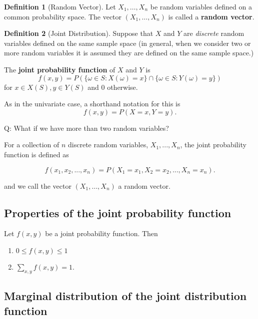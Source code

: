 \documentclass[
]{book}
\providecommand{\tightlist}{%
  \setlength{\itemsep}{0pt}\setlength{\parskip}{0pt}}
\theoremstyle{definition}
\newtheorem{definition}{Definition}[chapter]
\theoremstyle{definition}
\theoremstyle{definition}
\theoremstyle{definition}
\theoremstyle{remark}
\begin{document}
\begin{definition}[Random Vector]
Let \(X_1,\dots,X_n\) be random variables defined on a common probability space. The vector \((X_1,\dots,X_n)\) is called a \textbf{random vector}.
\end{definition}

\begin{definition}[Joint Distribution]
Suppose that \(X\) and \(Y\) are \emph{discrete} random variables defined on the same sample space (in general, when we consider two or more random variables it is assumed they are defined on the same sample space.)

The \textbf{joint probability function} of \(X\) and \(Y\) is
\[
f(x,y) = P( \{\omega\in S:X(\omega)=x\} \cap \{\omega\in S:Y(\omega)=y\} )
\]
for \(x\in X(S),y\in Y(S)\) and 0 otherwise.

As in the univariate case, a shorthand notation for this is
\[
f(x,y) = P(X=x,Y=y).
\]
\end{definition}

Q: What if we have more than two random variables?

For a collection of \(n\) discrete random variables, \(X_1,...,X_n\), the joint probability function is defined as

\[
f(x_1,x_2,...,x_n)=P(X_1=x_1,X_2=x_2,...,X_n=x_n).
\]

and we call the vector \((X_1,\dots,X_n)\) a random vector.

\subsection{Properties of the joint probability function}\label{properties-of-the-joint-probability-function}

Let \(f(x,y)\) be a joint probability function. Then

\begin{enumerate}
\def\labelenumi{\arabic{enumi}.}
\tightlist
\item
  \(0\leq f(x,y) \le 1\)
\item
  \(\sum_{x,y} f(x,y) = 1\).
\end{enumerate}

\subsection{Marginal distribution of the joint distribution function}\label{marginal-distribution-of-the-joint-distribution-function}
\end{document}
